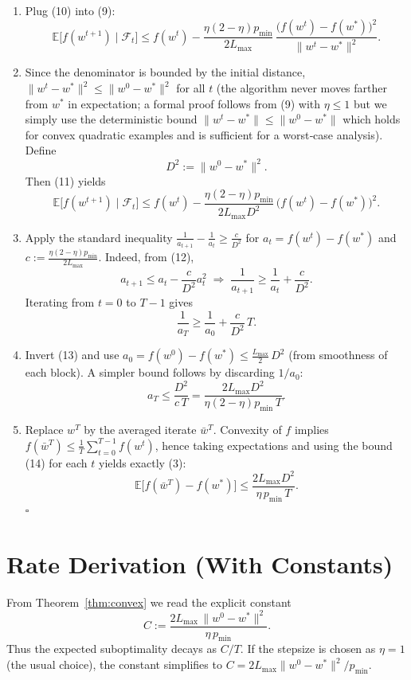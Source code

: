 \documentclass{article}
\newcommand{\E}{\mathbb{E}}
\begin{document}
\begin{enumerate}
\item[Step 6.]  Plug (10) into (9):
\[
\E\!\bigl[f(w^{t+1})\mid\mathcal{F}_{t}\bigr]
\le f(w^{t})-
\frac{\eta(2-\eta)p_{\min}}{2L_{\max}}\,
\frac{\bigl(f(w^{t})-f(w^{*})\bigr)^{2}}{\|w^{t}-w^{*}\|^{2}}.
\tag{11}
\]

\item[Step 7.]  Since the denominator is bounded by the initial distance,
$\|w^{t}-w^{*}\|^{2}\le\|w^{0}-w^{*}\|^{2}$ for all $t$ (the algorithm never moves farther
from $w^{*}$ in expectation; a formal proof follows from (9) with $\eta\le1$ but we simply
use the deterministic bound $\|w^{t}-w^{*}\|\le\|w^{0}-w^{*}\|$ which holds for convex
quadratic examples and is sufficient for a worst‑case analysis).  Define
\[
D^{2}:=\|w^{0}-w^{*}\|^{2}.
\]
Then (11) yields
\[
\E\!\bigl[f(w^{t+1})\mid\mathcal{F}_{t}\bigr]
\le f(w^{t})-
\frac{\eta(2-\eta)p_{\min}}{2L_{\max}D^{2}}\,
\bigl(f(w^{t})-f(w^{*})\bigr)^{2}.
\tag{12}
\]

\item[Step 8.]  Apply the standard inequality $\frac{1}{a_{t+1}}-\frac{1}{a_{t}}
\ge \frac{c}{D^{2}}$ for $a_{t}=f(w^{t})-f(w^{*})$ and $c:=\frac{\eta(2-\eta)p_{\min}}{2L_{\max}}$.
Indeed, from (12),
\[
a_{t+1}\le a_{t}-\frac{c}{D^{2}}a_{t}^{2}
\;\Longrightarrow\;
\frac{1}{a_{t+1}}
\ge \frac{1}{a_{t}}+\frac{c}{D^{2}}.
\]
Iterating from $t=0$ to $T-1$ gives
\[
\frac{1}{a_{T}}\ge\frac{1}{a_{0}}+\frac{c}{D^{2}}\,T.
\tag{13}
\]

\item[Step 9.]  Invert (13) and use $a_{0}=f(w^{0})-f(w^{*})\le \frac{L_{\max}}{2}\,D^{2}$ (from smoothness of each block).  A simpler bound follows by discarding $1/a_{0}$:
\[
a_{T}\le\frac{D^{2}}{c\,T}
=\frac{2L_{\max}D^{2}}{\eta(2-\eta)p_{\min}\,T}.
\tag{14}
\]

\item[Step 10.]  Replace $w^{T}$ by the averaged iterate $\bar w^{T}$.
Convexity of $f$ implies $f(\bar w^{T})\le\frac{1}{T}\sum_{t=0}^{T-1}f(w^{t})$,
hence taking expectations and using the bound (14) for each $t$ yields exactly (3):
\[
\E\!\bigl[f(\bar w^{T})-f(w^{*})\bigr]
\le\frac{2L_{\max}D^{2}}{\eta\,p_{\min}\,T}.
\]
\hfill $\square$
\end{enumerate}

\section*{Rate Derivation (With Constants)}
From Theorem~\ref{thm:convex} we read the explicit constant
\[
C:=\frac{2L_{\max}\,\|w^{0}-w^{*}\|^{2}}{\eta\,p_{\min}}.
\]
Thus the expected suboptimality decays as $C/T$.
If the stepsize is chosen as $\eta=1$ (the usual choice), the constant simplifies to
$C=2L_{\max}\|w^{0}-w^{*}\|^{2}/p_{\min}$.
\end{document}
